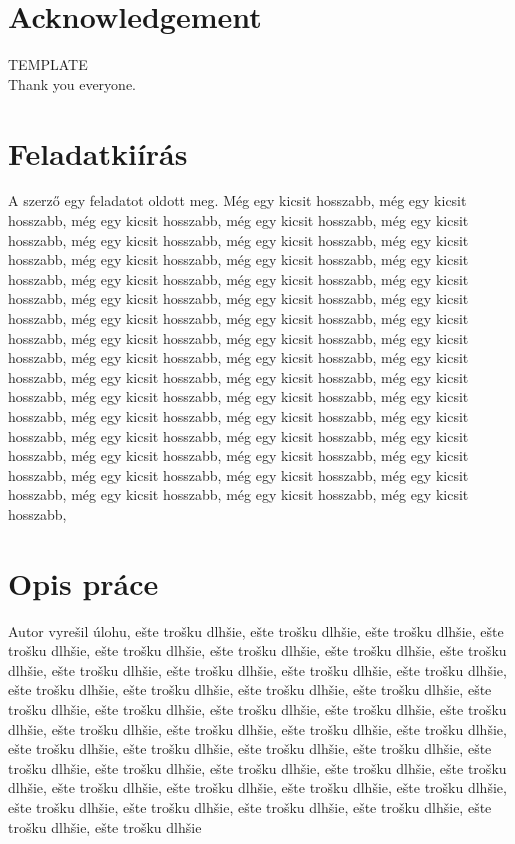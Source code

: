 \documentclass[a4paper,oneside,onecolumn,12pt]{LegrandOrangeBook}
\begin{document}
\chapter*{Acknowledgement}
TEMPLATE\\
Thank you everyone.
\pagebreak

\tableofcontents
\pagebreak

\listoffigures
{}

\pagebreak

\newcommand{\chpt}[1]{\chapter*{#1}\addcontentsline{toc}{section}{#1}}

\chpt{Feladatkiírás}

A szerző egy feladatot oldott meg. Még egy kicsit hosszabb, még egy kicsit hosszabb, még egy kicsit hosszabb, még egy kicsit hosszabb, még egy kicsit hosszabb, még egy kicsit hosszabb, még egy kicsit hosszabb, még egy kicsit hosszabb, még egy kicsit hosszabb, még egy kicsit hosszabb, még egy kicsit hosszabb, még egy kicsit hosszabb, még egy kicsit hosszabb, még egy kicsit hosszabb, még egy kicsit hosszabb, még egy kicsit hosszabb, még egy kicsit hosszabb, még egy kicsit hosszabb, még egy kicsit hosszabb, még egy kicsit hosszabb, még egy kicsit hosszabb, még egy kicsit hosszabb, még egy kicsit hosszabb, még egy kicsit hosszabb, még egy kicsit hosszabb, még egy kicsit hosszabb, még egy kicsit hosszabb, még egy kicsit hosszabb, még egy kicsit hosszabb, még egy kicsit hosszabb, még egy kicsit hosszabb, még egy kicsit hosszabb, még egy kicsit hosszabb, még egy kicsit hosszabb, még egy kicsit hosszabb, még egy kicsit hosszabb, még egy kicsit hosszabb, még egy kicsit hosszabb, még egy kicsit hosszabb, még egy kicsit hosszabb, még egy kicsit hosszabb, még egy kicsit hosszabb, még egy kicsit hosszabb, még egy kicsit hosszabb, még egy kicsit hosszabb, még egy kicsit hosszabb, még egy kicsit hosszabb,  

\chpt{Opis práce}

Autor vyrešil úlohu, ešte trošku dlhšie, ešte trošku dlhšie, ešte trošku dlhšie, ešte trošku dlhšie, ešte trošku dlhšie, ešte trošku dlhšie, ešte trošku dlhšie, ešte trošku dlhšie, ešte trošku dlhšie, ešte trošku dlhšie, ešte trošku dlhšie, ešte trošku dlhšie, ešte trošku dlhšie, ešte trošku dlhšie, ešte trošku dlhšie, ešte trošku dlhšie, ešte trošku dlhšie, ešte trošku dlhšie, ešte trošku dlhšie, ešte trošku dlhšie, ešte trošku dlhšie, ešte trošku dlhšie, ešte trošku dlhšie, ešte trošku dlhšie, ešte trošku dlhšie, ešte trošku dlhšie, ešte trošku dlhšie, ešte trošku dlhšie, ešte trošku dlhšie, ešte trošku dlhšie, ešte trošku dlhšie, ešte trošku dlhšie, ešte trošku dlhšie, ešte trošku dlhšie, ešte trošku dlhšie, ešte trošku dlhšie, ešte trošku dlhšie, ešte trošku dlhšie, ešte trošku dlhšie, ešte trošku dlhšie, ešte trošku dlhšie, ešte trošku dlhšie, ešte trošku dlhšie, ešte trošku dlhšie
\pagebreak
\end{document}
